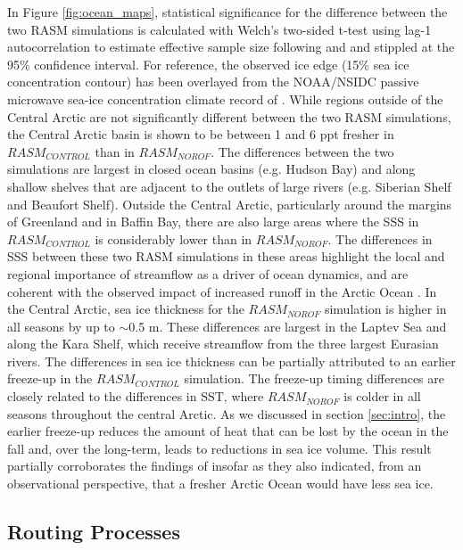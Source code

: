 \documentclass[jgrga, draft]{agutex}
\begin{document}
\begin{article}
In Figure \ref{fig:ocean_maps}, statistical significance for the difference between the two RASM simulations is calculated with Welch's two-sided t-test using lag-1 autocorrelation to estimate effective sample size following \citet{VonStorch1999} and \citet{Wilks2006} and stippled at the 95\% confidence interval.
For reference, the observed ice edge (15\% sea ice concentration contour) has been overlayed from the NOAA/NSIDC passive microwave sea-ice concentration climate record of \citep{Meier2013}.
While regions outside of the Central Arctic are not significantly different between the two RASM simulations, the Central Arctic basin is shown to be between 1 and 6 ppt fresher in $RASM_{CONTROL}$ than in $RASM_{NOROF}$.
The differences between the two simulations are largest in closed ocean basins (e.g. Hudson Bay) and along shallow shelves that are adjacent to the outlets of large rivers (e.g. Siberian Shelf and Beaufort Shelf).
Outside the Central Arctic, particularly around the margins of Greenland and in Baffin Bay, there are also large areas where the SSS in $RASM_{CONTROL}$ is considerably lower than in $RASM_{NOROF}$.
The differences in SSS between these two RASM simulations in these areas highlight the local and regional importance of streamflow as a driver of ocean dynamics, and are coherent with the observed impact of increased runoff in the Arctic Ocean \citep [e.g.][]{Morison_2012}.
In the Central Arctic, sea ice thickness for the $RASM_{NOROF}$ simulation is higher in all seasons by up to $\sim$0.5 m.
These differences are largest in the Laptev Sea and along the Kara Shelf, which receive streamflow from the three largest Eurasian rivers.
The differences in sea ice thickness can be partially attributed to an earlier freeze-up in the $RASM_{CONTROL}$ simulation.
The freeze-up timing differences are closely related to the differences in SST, where $RASM_{NOROF}$ is colder in all seasons throughout the central Arctic.
As we discussed in section \ref{sec:intro}, the earlier freeze-up reduces the amount of heat that can be lost by the ocean in the fall and, over the long-term, leads to reductions in sea ice volume.
This result partially corroborates the findings of \citep{Morison_2012} insofar as they also indicated, from an observational perspective, that a fresher Arctic Ocean would have less sea ice.

\subsection{Routing Processes}


\end{article}
\end{document}
